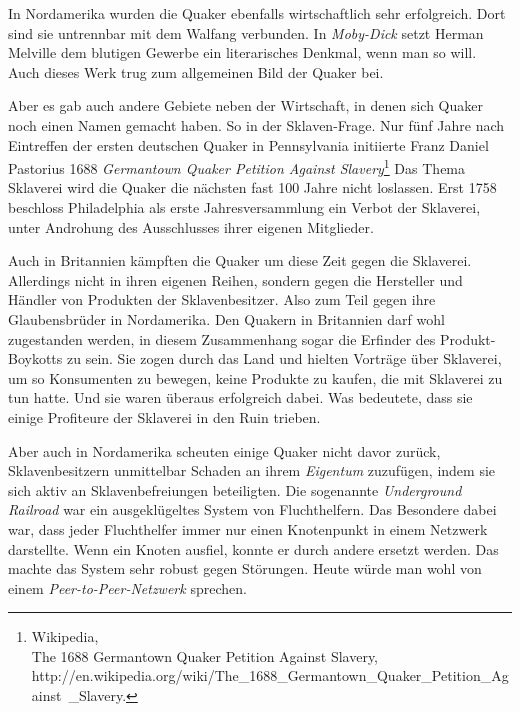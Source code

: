 \medskip

In Nordamerika wurden die Quaker ebenfalls wirtschaftlich sehr erfolgreich. Dort
sind sie untrennbar mit dem Walfang verbunden. In
\textit{Moby-Dick} setzt
Herman Melville dem blutigen Gewerbe ein
literarisches Denkmal, wenn man so
will. Auch dieses Werk trug zum allgemeinen Bild der Quaker bei.

\medskip

Aber es gab auch andere Gebiete neben der Wirtschaft, in denen sich Quaker noch
einen
Namen gemacht haben. So in der Sklaven-Frage. Nur fünf Jahre
nach Eintreffen
der ersten deutschen Quaker in Pennsylvania initiierte Franz Daniel Pastorius
1688 \textit{Germantown Quaker Petition Against Slavery}\footnote{Wikipedia,
\\The 1688 Germantown Quaker Petition Against Slavery,
\\http://en.wikipedia.org/wiki/The\_1688\_Germantown\_Quaker\_Petition\_Against\
\_Slavery.} Das Thema Sklaverei wird die Quaker die nächsten fast 100 Jahre
nicht
loslassen. Erst 1758 beschloss Philadelphia als erste
Jahresversammlung ein Verbot der Sklaverei,
unter Androhung des Ausschlusses ihrer eigenen Mitglieder.

\medskip

Auch in Britannien kämpften die Quaker um diese Zeit gegen die Sklaverei.
Allerdings nicht in ihren eigenen Reihen, sondern gegen die Hersteller
und Händler von Produkten der Sklavenbesitzer. Also zum Teil gegen ihre
Glaubensbrüder in Nordamerika. Den Quakern in Britannien darf wohl zugestanden
werden, in diesem Zusammenhang sogar die Erfinder des Produkt-Boykotts zu sein.
Sie zogen durch das Land und hielten Vorträge über Sklaverei, um so Konsumenten
zu
bewegen, keine Produkte zu kaufen, die mit Sklaverei zu tun hatte. Und sie
waren überaus erfolgreich dabei. Was bedeutete, dass sie einige Profiteure der
Sklaverei in den Ruin trieben.

\medskip

Aber auch in Nordamerika scheuten einige Quaker nicht
davor zurück,
Sklavenbesitzern unmittelbar Schaden an ihrem \textit{Eigentum} zuzufügen, indem
sie sich
aktiv an Sklavenbefreiungen beteiligten. Die sogenannte
\textit{Underground Railroad} war ein
ausgeklügeltes System von Fluchthelfern. Das
Besondere dabei war, dass jeder Fluchthelfer
immer
nur einen Knotenpunkt in einem
Netzwerk darstellte. Wenn ein Knoten ausfiel, konnte er durch andere ersetzt
werden. Das machte das System sehr robust gegen Störungen. Heute würde man
wohl
von einem \textit{Peer-to-Peer-Netzwerk} sprechen.

